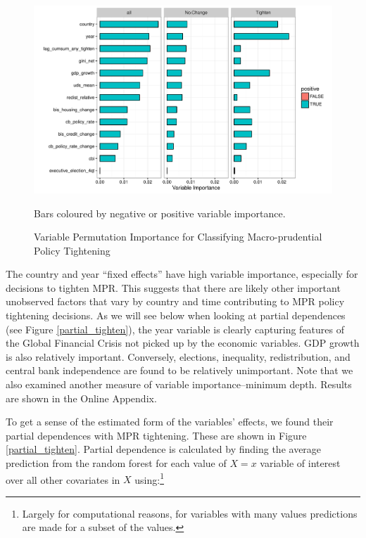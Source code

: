 \documentclass[]{article}
\let\rmarkdownfootnote\footnote%
\def\footnote{\protect\rmarkdownfootnote}
\begin{document}
\begin{figure}
    \caption{Variable Permutation Importance for Classifying Macro-prudential Policy Tightening}
    \label{imp_tighten}
    \begin{center}
        \includegraphics{figures/tighten_imp.pdf}
    \end{center}

    {\scriptsize{Bars coloured by negative or positive variable importance.}}

\end{figure}

The country and year ``fixed effects'' have high variable importance,
especially for decisions to tighten MPR. This suggests that there are
likely other important unobserved factors that vary by country and time
contributing to MPR policy tightening decisions. As we will see below
when looking at partial dependences (see Figure \ref{partial_tighten}),
the year variable is clearly capturing features of the Global Financial
Crisis not picked up by the economic variables. GDP growth is also
relatively important. Conversely, elections, inequality, redistribution,
and central bank independence are found to be relatively unimportant.
Note that we also examined another measure of variable
importance--minimum depth. Results are shown in the Online Appendix.

To get a sense of the estimated form of the variables' effects, we found
their partial dependences with MPR tightening. These are shown in Figure
\ref{partial_tighten}. Partial dependence is calculated by finding the
average prediction from the random forest for each value of \(X = x\)
variable of interest over all other covariates in \(X\) using:\footnote{Largely
  for computational reasons, for variables with many values predictions
  are made for a subset of the values.}
\end{document}
